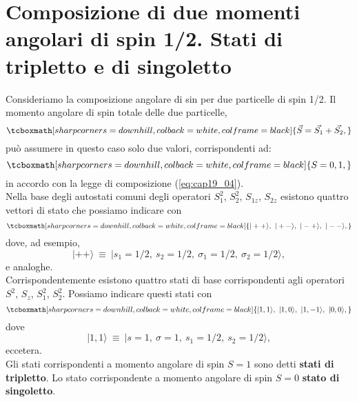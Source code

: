 \section[Composizione di due momenti angolari di spin 1/2. Stati di tripletto e di singoletto]{Composizione di due momenti angolari di spin 1/2. Stati di tripletto e di singoletto}
Consideriamo la composizione angolare di sin per due particelle di spin 1/2. Il momento angolare di spin totale delle due particelle,
	\begin{equation}
		\tcboxmath[sharp corners=downhill, colback=white, colframe=black]{
			\vec{S} = \vec{S_1} + \vec{S_2} ,
			}
	\end{equation}
può assumere in questo caso solo due valori, corrispondenti ad:
	\begin{equation}
		\tcboxmath[sharp corners=downhill, colback=white, colframe=black]{
			S= 0, 1 ,
			}
	\end{equation}
in accordo con la legge di composizione (\ref{eq:cap19_04}).\\

Nella base degli autostati comuni degli operatori $S_1^2$, $S_2^2$, $ S_{1z}$, $S_{2z}$ esistono quattro vettori di stato che possiamo indicare con  
	\begin{equation}
		\tcboxmath[sharp corners=downhill, colback=white, colframe=black]{
			|++\rangle ,~ |+-\rangle,~ |-+\rangle , ~|--\rangle  ,
			}
	\end{equation}
dove, ad esempio,
	\begin{equation}
		|++\rangle~ \equiv ~|s_1=1/2, ~s_2=1/2,~\sigma_1 = 1/2, ~\sigma_2 = 1/2\rangle ,
	\end{equation}
e analoghe. \\

Corrispondentemente esistono quattro stati di base corrispondenti agli operatori $S^2$, $S_z$, $S_1^2$, $S_2^2$. Possiamo indicare questi stati con 
	\begin{equation}
		\tcboxmath[sharp corners=downhill, colback=white, colframe=black]{
			|1,1\rangle, ~|1,0\rangle, ~|1,-1\rangle, ~|0,0\rangle ,
			}
	\end{equation}
dove
	\begin{equation}
		|1,1\rangle ~\equiv~ |s=1, ~ \sigma=1, ~s_1=1/2, ~s_2=1/2\rangle ,
	\end{equation}
eccetera. \\

Gli stati corrispondenti a momento angolare di spin $S=1$ sono detti \textbf{stati di tripletto}. Lo stato corrispondente a momento angolare di spin $S=0$ \textbf{stato di singoletto}. \\

